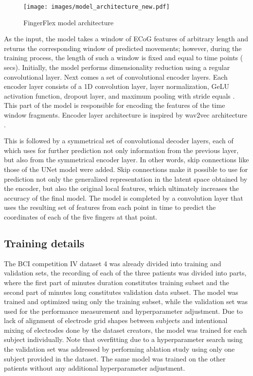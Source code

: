 \documentclass[letterpaper]{article} \usepackage{aaai22}  \usepackage{times}  \usepackage{helvet}  \usepackage{courier}  \usepackage[hyphens]{url}  \usepackage{graphicx} \urlstyle{rm} \def\UrlFont{\rm}  \usepackage{natbib}  \usepackage{caption} \DeclareCaptionStyle{ruled}{labelfont=normalfont,labelsep=colon,strut=off} \frenchspacing  \setlength{\pdfpagewidth}{8.5in}  \setlength{\pdfpageheight}{11in}  \usepackage{algorithm}
\begin{document}
\begin{figure*}[ht]
    \centering
    \texttt{[image: images/model\_architecture\_new.pdf]}
    \caption{FingerFlex model architecture}
    \label{fig:model_architecture}
\end{figure*}





As the input, the model takes a window of ECoG features of arbitrary length and returns the corresponding window of predicted movements; however, during the training process, the length of such a window is fixed and equal to  time points ( secs). Initially, the model performs dimensionality reduction using a regular convolutional layer. Next comes a set of convolutional encoder layers. Each encoder layer consists of a 1D convolution layer, layer normalization, GeLU activation function, dropout layer, and maximum pooling with stride equals . This part of the model is responsible for encoding the features of the time window fragments. Encoder layer architecture is inspired by wav2vec architecture \citep{schneider2019}.

This is followed by a symmetrical set of convolutional decoder layers, each of which uses for further prediction not only information from the previous layer, but also from the symmetrical encoder layer. In other words, skip connections like those of the UNet model \citep{ronneberger2015} were added. Skip connections make it possible to use for prediction not only the generalized representation in the latent space obtained by the encoder, but also the original local features, which ultimately increases the accuracy of the final model. The model is completed by a  convolution layer that uses the resulting set of features from each point in time to predict the coordinates of each of the five fingers at that point.


\subsection{Training details}

The BCI competition IV dataset 4 was already divided into training and validation sets, the recording of each of the three patients was divided into  parts, where the first part of  minutes duration constitutes training subset and the second part of  minutes long constitutes validation data subset. The model was trained and optimized using only the training subset, while the validation set was used for the performance measurement and hyperparameter adjustment. Due to lack of alignment of electrode grid shapes between subjects and intentional mixing of electrodes done by the dataset creators, the model was trained for each subject individually. Note that overfitting due to a hyperparameter search using the validation set was addressed by performing ablation study using only one subject provided in the dataset. The same model was trained on the other patients without any additional hyperparameter adjustment.
\end{document}
